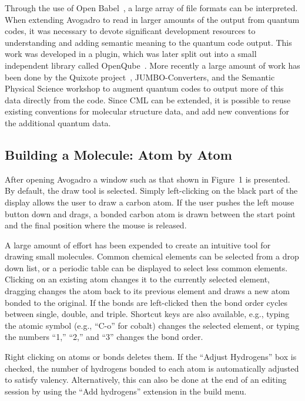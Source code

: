 \documentclass[10pt]{bmc_article}
\newenvironment{bmcformat}{\begin{raggedright}
  \baselineskip20pt\sloppy\setboolean{publ}{false}}{\end{raggedright}
  \baselineskip20pt\sloppy}
\begin{document}
\begin{bmcformat}
Through the use of Open Babel~\cite{OpenBabel}, a large array of file formats
can be interpreted. When extending Avogadro to read in larger amounts of the
output from quantum codes, it was necessary to devote significant development
resources to understanding and adding semantic meaning to the quantum code
output. This work was developed in a plugin, which was later split out into a
small independent library called OpenQube~\cite{OpenQube,OpenQubeSource}. More
recently a large amount of work has been done by the Quixote
project~\cite{Quixote}, JUMBO-Converters, and the Semantic Physical Science
workshop to augment quantum codes to output more of this data directly from the
code. Since CML can be extended, it is possible to reuse existing conventions
for molecular structure data, and add new conventions for the additional quantum
data.

\subsection*{Building a Molecule: Atom by Atom}

After opening Avogadro a window such as that shown in Figure~1
is presented. By default, the draw tool is selected. Simply left-clicking on the
black part of the display
allows the user to draw a carbon atom. If the user pushes the left
mouse button down and drags, a bonded carbon atom is drawn
between the start point and the final position where the mouse is released.

A large amount of effort has been expended to create an intuitive tool for
drawing small molecules. Common chemical elements can be selected from a drop
down list,
or a periodic table can be displayed to select less common elements. Clicking on
an existing atom changes it to the currently selected element,
dragging changes the atom back to its previous element and draws
a new atom bonded to the original. If the bonds are left-clicked then the bond
order cycles between single, double, and triple. Shortcut keys are
also available, e.g., typing the
atomic symbol (e.g., ``C-o'' for cobalt) changes the selected element,
or typing the numbers ``1,'' ``2,'' and ``3'' changes the bond order.

Right clicking on atoms or bonds deletes them. If the ``Adjust Hydrogens'' box
is checked, the number of hydrogens bonded to each atom is automatically
adjusted to satisfy valency. Alternatively, this can also be done at the end of
an editing session by using the ``Add hydrogens'' extension in the build menu.


\end{bmcformat}
\end{document}
